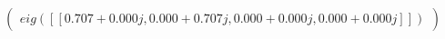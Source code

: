 \documentclass[border=1em]{standalone}
\begin{document}
$
\left(
\begin{array}{cccc}
eig([[0.707+0.000j, 0.000+0.707j, 0.000+0.000j, 0.000+0.000j]])
\end{array}
\right)
$
\end{document}
